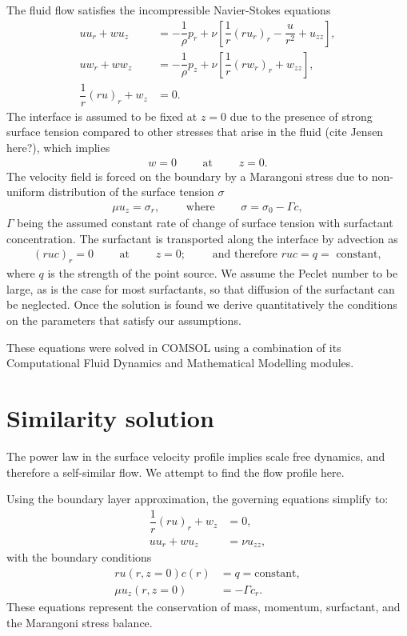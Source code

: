 \documentclass[aps, floatfix, superscriptaddress]{revtex4}
\begin{document}
The fluid flow satisfies the incompressible Navier-Stokes equations
\begin{align}
 u u_r + w u_z &= -\dfrac{1}{\rho} p_r + \nu \left[ \dfrac{1}{r} \left( ru_r \right)_r -\dfrac{u}{r^2} + u_{zz} \right], \\
 u w_r + w w_z &= -\dfrac{1}{\rho} p_z + \nu \left[ \dfrac{1}{r} \left( rw_r \right)_r + w_{zz} \right], \\
 \dfrac{1}{r} (ru)_r + w_z &= 0.
\end{align}
The interface is assumed to be fixed at $z=0$ due to the presence of strong surface tension compared to other stresses that arise in the fluid (cite Jensen here?), which implies
\begin{align}
 w=0 \qquad \text{ at } \qquad z=0.
\end{align}
The velocity field is forced on the boundary by a Marangoni stress due to non-uniform distribution of the surface tension $\sigma$
\begin{align}
 \mu u_z = \sigma_r, \qquad \text{ where } \qquad \sigma = \sigma_0 - \Gamma c,
\end{align}
$\Gamma$ being the assumed constant rate of change of surface tension with surfactant concentration.
The surfactant is transported along the interface by advection as
\begin{align}
 (ruc)_r = 0 \qquad \text{ at } \qquad z=0; \qquad \text{ and therefore } ruc = q = \text{ constant},
\end{align}
where $q$ is the strength of the point source.
We assume the Peclet number to be large, as is the case for most surfactants, so that diffusion of the surfactant can be neglected.
Once the solution is found we derive quantitatively the conditions on the parameters that satisfy our assumptions.

These equations were solved in COMSOL using a combination of its Computational Fluid Dynamics and Mathematical Modelling modules. 

\section{Similarity solution}
The power law in the surface velocity profile implies scale free dynamics, and therefore a self-similar flow.
We attempt to find the flow profile here.

Using the boundary layer approximation, the governing equations simplify to:
\begin{align}
 \dfrac{1}{r} (ru)_r + w_z &= 0, \\
 uu_r + wu_z &= \nu u_{zz},
\end{align}
with the boundary conditions
\begin{align}
 ru(r,z=0) c(r) &= q = \text{constant}, \\
 \mu u_z(r, z=0) &= - \Gamma c_r.
\end{align}
These equations represent the conservation of mass, momentum, surfactant, and the Marangoni stress balance.
\end{document}
